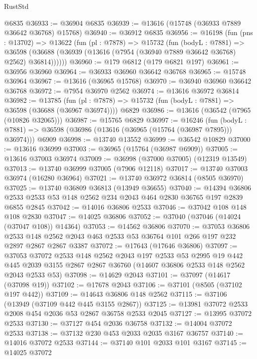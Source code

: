\begin{lexlean}{RustStd}
\begin{coremodule}
    @6835
@36933 := @36904 @6835
@36939 := @13616 (@15748 (@36933 @7889 @36642 @36768) @15768)
@36940 := @36912 @6835
@36956 := @16198
    (fun (pns : @13702) =>
    @13622
      (fun (pl : @7878) =>
      @15732
        (fun (bodyL : @7881) =>
        @36598 (@36688 (@36939 (@13616 (@7954 (@36940 @7889 @36642 @36768) @2562) @36814))))))
@36960 := @179 @6812 (@179 @6821 @197)
@36961 := @36956 @36960
@36964 := @36933 @36960 @36642 @36768
@36965 := @15748 @36964
@36967 := @13616 (@36965 @15768)
@36970 := @36940 @36960 @36642 @36768
@36972 := @7954 @36970 @2562
@36974 := @13616 @36972 @36814
@36982 := @13785
    (fun (pl : @7878) => @15732 (fun (bodyL : @7881) => @36598 (@36688 (@36967 @36974))))
    @6829
@36986 := @13616 (@36542 (@7965 (@10826 @32065)))
@36987 := @15765 @6829
@36997 := @16246
    (fun (bodyL : @7881) => @36598 (@36986 (@13616 (@36965 (@15764 (@36987 @7895))) @36974)))
    @6909
@36998 := @13740 @13552
@36999 := @36542 @10829
@37000 := @13616 @36999
@37003 := @36965 (@15764 (@36987 @6909))
@37005 := @13616 @37003 @36974
@37009 := @36998 (@37000 @37005) (@12319 @13549)
@37013 := @13740 @36999 @37005 (@7906 @12118)
@37017 := @13740 @37003 @36974 (@16280 @36964)
@37021 := @13740 @36972 @36814 (@8505 @36970)
@37025 := @13740 @36809 @36813 (@13949 @36655)
@37040 := @14394
    @36806
    @2533
    @2533
    @53
    @148
    @2562
    @234
    @2043
    @464
    @2830
    @36765
    @197
    @2839
    @6855
    @2845
@37042 := @14016 @36806 @2533
@37046 := @37042 @108 @148 @108 @2830
@37047 := @14025 @36806
@37052 := @37040 (@37046 (@14024 (@37047 @108)) @14364)
@37053 := @14562 @36806
@37070 := @37053
    @36806
    @2533
    @148
    @2562
    @2043
    @463
    @2533
    @53
    @36764
    @101
    @266
    @197
    @232
    @2897
    @2867
    @2867
    @3387
@37072 := @17643 (@17646 @36806)
@37097 := @37053
    @37072
    @2533
    @148
    @2562
    @2043
    @197
    @2533
    @53
    @2995
    @19
    @442
    @445
    @2039
    @3155
    @2867
    @2867
    @36760
    (@14607 @36806 @2533 @148 @2562 @2043 @2533 @53)
@37098 := @14629 @2043
@37101 := @37097 (@14617 (@37098 @19))
@37102 := @17678 @2043
@37106 := @37101 (@8505 (@37102 @197 @442))
@37109 := @14643 @36806 @148 @2562
@37115 := @37106 (@13949 (@37109 @442 @445 @3155 @2867))
@37125 := @13981 @37072 @2533 @2008 @454 @2036 @53 @2867 @36758 @2533 @2045
@37127 := @13995 @37072 @2533
@37130 := @37127 @454 @2036 @36758
@37132 := @14004 @37072 @2533
@37138 := @37132 @230 @453 @2033 @2035 @3167 @36757
@37140 := @14016 @37072 @2533
@37144 := @37140 @101 @2033 @101 @3167
@37145 := @14025 @37072

\end{coremodule}
\end{lexlean}
